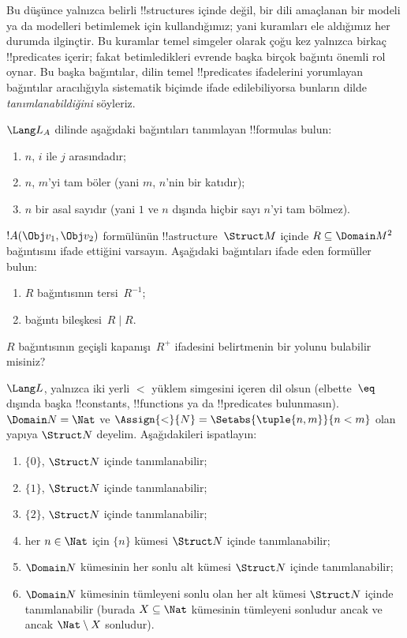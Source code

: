 \documentclass[../../../include/open-logic-section]{subfiles}
\begin{document}
\begin{explain}
Bu düşünce yalnızca belirli !!{structure}s içinde değil, bir dili
amaçlanan bir modeli ya da modelleri betimlemek için kullandığımız;
yani kuramları ele aldığımız her durumda ilginçtir. Bu kuramlar temel
simgeler olarak çoğu kez yalnızca birkaç !!{predicate}s içerir; fakat
betimledikleri evrende başka birçok bağıntı önemli rol oynar. Bu başka
bağıntılar, dilin temel !!{predicate}s ifadelerini yorumlayan bağıntılar
aracılığıyla sistematik biçimde ifade edilebiliyorsa bunların dilde
\emph{tanımlanabildiğini} söyleriz.
\end{explain}

\begin{prob}
$\Lang L_A$ dilinde aşağıdaki bağıntıları tanımlayan !!{formula}s bulun:
\begin{enumerate}
\item $n$, $i$ ile $j$ arasındadır;
\item $n$, $m$'yi tam böler (yani $m$, $n$'nin bir katıdır);
\item $n$ bir asal sayıdır (yani $1$ ve $n$ dışında hiçbir sayı $n$'yi
  tam bölmez).
\end{enumerate}
\end{prob}

\begin{prob}
$!A(\Obj v_1,\Obj v_2)$ formülünün !!a{structure}~$\Struct M$ içinde
$R\subseteq\Domain M^2$ bağıntısını ifade ettiğini varsayın. Aşağıdaki
bağıntıları ifade eden formüller bulun:
\begin{enumerate}
\item $R$ bağıntısının tersi~$R^{-1}$;
\item bağıntı bileşkesi~$R\mid R$.
\end{enumerate}
$R$ bağıntısının geçişli kapanışı~$R^+$ ifadesini belirtmenin bir
yolunu bulabilir misiniz?
\end{prob}

\begin{prob}
$\Lang L$, yalnızca iki yerli $<$ yüklem simgesini içeren dil olsun
(elbette~$\eq$ dışında başka !!{constant}s, !!{function}s ya da
!!{predicate}s bulunmasın). $\Domain N=\Nat$ ve
$\Assign{<}{N}=\Setabs{\tuple{n,m}}{n<m}$ olan yapıya $\Struct N$
deyelim. Aşağıdakileri ispatlayın:
\begin{enumerate}
\item $\{0\}$, $\Struct N$ içinde tanımlanabilir;
\item $\{1\}$, $\Struct N$ içinde tanımlanabilir;
\item $\{2\}$, $\Struct N$ içinde tanımlanabilir;
\item her $n\in\Nat$ için $\{n\}$ kümesi $\Struct N$ içinde
  tanımlanabilir;
\item $\Domain N$ kümesinin her sonlu alt kümesi $\Struct N$ içinde
  tanımlanabilir;
\item $\Domain N$ kümesinin tümleyeni sonlu olan her alt kümesi
  $\Struct N$ içinde tanımlanabilir (burada $X\subseteq\Nat$ kümesinin
  tümleyeni sonludur ancak ve ancak $\Nat\setminus X$ sonludur).
\end{enumerate}
\end{prob}
\end{document}
